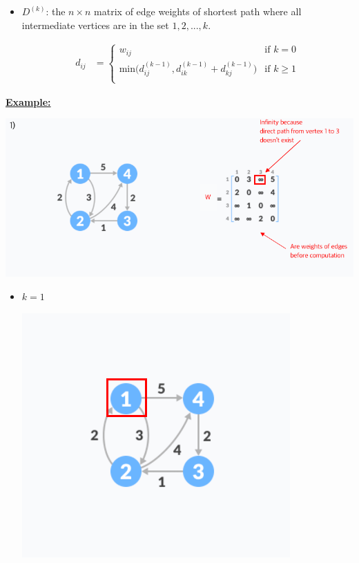 \documentclass[12pt]{article}
\begin{document}
\begin{enumerate}[1.]
\begin{itemize}
\begin{itemize}
\begin{itemize}
                \item $D^{(k)}$: the $n \times n$ matrix of edge weights of shortest path
                where all intermediate vertices are in the set ${1,2,...,k}$.

                \begin{align}
                    d_{ij} &= \begin{cases}
                        w_{ij} & \text{if $k = 0$}\\
                        \text{min($d_{ij}^{(k-1)}, d_{ik}^{(k-1)} + d_{kj}^{(k-1)}$)} & \text{if $k \geq 1$}\\
                    \end{cases}
                \end{align}
            \end{itemize}

            \bigskip

            \underline{\textbf{Example:}}

            \bigskip

            \begin{center}
            \includegraphics[width=\linewidth]{images/worksheet_4_solution_47.png}
            \end{center}

            \begin{itemize}
                \item $k = 1$

                \begin{center}
                \includegraphics[width=0.5\linewidth]{images/worksheet_4_solution_48.png}
                \end{center}


\end{itemize}
\end{itemize}
\end{itemize}
\end{enumerate}
\end{document}
